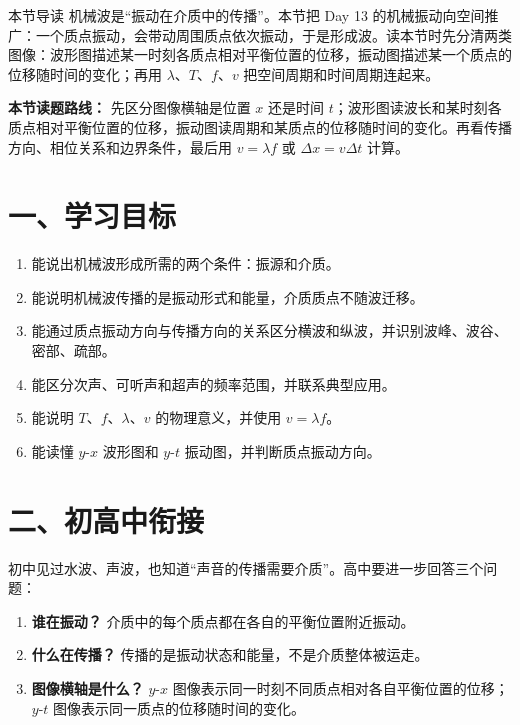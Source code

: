 
\begin{learningbox}{本节导读}
机械波是“振动在介质中的传播”。本节把 Day 13 的机械振动向空间推广：一个质点振动，会带动周围质点依次振动，于是形成波。读本节时先分清两类图像：波形图描述某一时刻各质点相对平衡位置的位移，振动图描述某一个质点的位移随时间的变化；再用 $\lambda$、$T$、$f$、$v$ 把空间周期和时间周期连起来。
\end{learningbox}

\textbf{本节读题路线：} 先区分图像横轴是位置 $x$ 还是时间 $t$；波形图读波长和某时刻各质点相对平衡位置的位移，振动图读周期和某质点的位移随时间的变化。再看传播方向、相位关系和边界条件，最后用 $v=\lambda f$ 或 $\Delta x=v\Delta t$ 计算。

\section*{一、学习目标}

\begin{enumerate}
  \item 能说出机械波形成所需的两个条件：振源和介质。
  \item 能说明机械波传播的是振动形式和能量，介质质点不随波迁移。
  \item 能通过质点振动方向与传播方向的关系区分横波和纵波，并识别波峰、波谷、密部、疏部。
  \item 能区分次声、可听声和超声的频率范围，并联系典型应用。
  \item 能说明 $T$、$f$、$\lambda$、$v$ 的物理意义，并使用 $v=\lambda f$。
  \item 能读懂 $y$-$x$ 波形图和 $y$-$t$ 振动图，并判断质点振动方向。
\end{enumerate}
\section*{二、初高中衔接}

初中见过水波、声波，也知道“声音的传播需要介质”。高中要进一步回答三个问题：

\begin{enumerate}
  \item \textbf{谁在振动？} 介质中的每个质点都在各自的平衡位置附近振动。
  \item \textbf{什么在传播？} 传播的是振动状态和能量，不是介质整体被运走。
  \item \textbf{图像横轴是什么？} $y$-$x$ 图像表示同一时刻不同质点相对各自平衡位置的位移；$y$-$t$ 图像表示同一质点的位移随时间的变化。
\end{enumerate}

